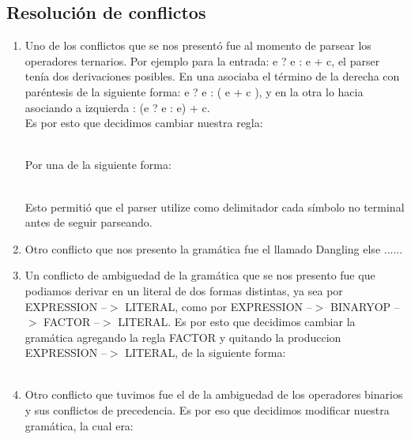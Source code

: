 \subsection{Resolución de conflictos}
\begin{enumerate}
    
\item Uno de los conflictos que se nos presentó fue al momento de parsear los
operadores ternarios. Por ejemplo para la entrada: e ? e : e + c, el parser
tenía dos derivaciones posibles. En una asociaba el término de la derecha con
paréntesis de la siguiente forma: e ? e : ( e + c ), y en la otra lo hacia
asociando a izquierda : (e ? e : e) + c. \\
Es por esto que decidimos cambiar nuestra regla: 
\\
\begin{reglas}
\end{reglas}
\\
Por una de la siguiente forma:
\\
\begin{reglas}
\end{reglas}
\\
Esto permitió que el parser utilize como delimitador cada símbolo no terminal
antes de seguir parseando.

\item Otro conflicto que nos presento la gramática fue el llamado Dangling else
  ......

\item Un conflicto de ambiguedad de la gramática que se nos presento fue que
  podiamos derivar en un literal de dos formas distintas, ya sea por EXPRESSION
  --$>$ LITERAL, como por EXPRESSION --$>$ BINARYOP --$>$ FACTOR --$>$ LITERAL. Es por esto que decidimos cambiar la
  gramática agregando la regla FACTOR y quitando la produccion EXPRESSION --$>$
  LITERAL, de la siguiente forma:
  \\
  \\
  \begin{reglas} 
  \end{reglas}

\item Otro conflicto que tuvimos fue el de la ambiguedad de los operadores
  binarios y sus conflictos de precedencia. Es por eso que decidimos modificar
  nuestra gramática, la cual era:


\end{enumerate}
